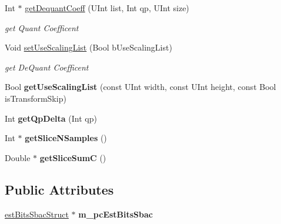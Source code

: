 \begin{DoxyCompactItemize}
Int $\ast$ \hyperlink{class_t_com_tr_quant_ad7a885d13dbbad93bb0c41a885041732}{get\+Dequant\+Coeff} (U\+Int list, Int qp, U\+Int size)
\begin{DoxyCompactList}\small\item\em get Quant Coefficent \end{DoxyCompactList}\item 
\mbox{\label{class_t_com_tr_quant_a708a4e3947e780ef0e2affc32ac44758}} 
Void \hyperlink{class_t_com_tr_quant_a708a4e3947e780ef0e2affc32ac44758}{set\+Use\+Scaling\+List} (Bool b\+Use\+Scaling\+List)
\begin{DoxyCompactList}\small\item\em get De\+Quant Coefficent \end{DoxyCompactList}\item 
\mbox{\label{class_t_com_tr_quant_af6d2b8039080e66ee2b932f3ae1cf475}} 
Bool {\bfseries get\+Use\+Scaling\+List} (const U\+Int width, const U\+Int height, const Bool is\+Transform\+Skip)
\item 
\mbox{\label{class_t_com_tr_quant_a6c0f7cb2c8aeab93f4f1fc503e838ebe}} 
Int {\bfseries get\+Qp\+Delta} (Int qp)
\item 
\mbox{\label{class_t_com_tr_quant_a16cf346dd173fe7d367a8e82ab6475fc}} 
Int $\ast$ {\bfseries get\+Slice\+N\+Samples} ()
\item 
\mbox{\label{class_t_com_tr_quant_a7d04cdf841ecf4eaba1038ed98c8d64a}} 
Double $\ast$ {\bfseries get\+Slice\+SumC} ()
\end{DoxyCompactItemize}
\subsection*{Public Attributes}
\begin{DoxyCompactItemize}
\item 
\mbox{\label{class_t_com_tr_quant_a497bf6e379dd3d89997238b06e28020f}} 
\hyperlink{structest_bits_sbac_struct}{est\+Bits\+Sbac\+Struct} $\ast$ {\bfseries m\+\_\+pc\+Est\+Bits\+Sbac}
\end{DoxyCompactItemize}
